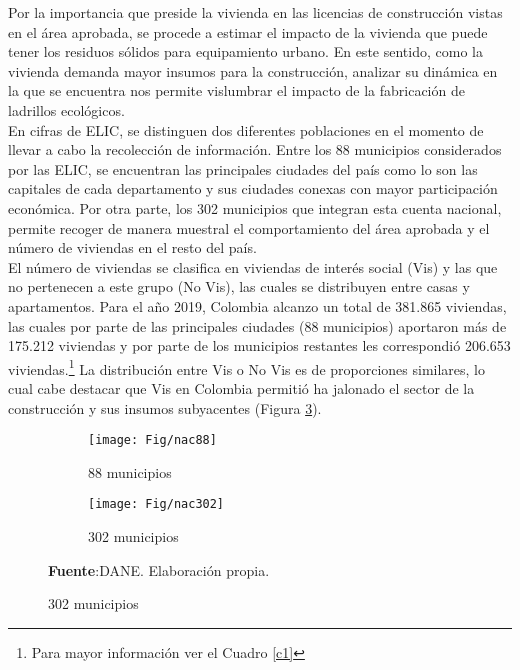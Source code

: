 \documentclass[12pt]{article}
\begin{document}
Por la importancia que  preside la vivienda en las licencias de construcción vistas en el área aprobada, se procede a estimar el impacto de la vivienda que puede tener los residuos sólidos para equipamiento urbano. En este sentido, como la vivienda demanda mayor insumos para la construcción, analizar su dinámica en la que se encuentra nos permite vislumbrar el impacto de la fabricación de ladrillos ecológicos.\\

En cifras de ELIC, se distinguen dos diferentes poblaciones en el momento de llevar a cabo la recolección de información. Entre los 88 municipios considerados por las ELIC, se encuentran las principales ciudades del país como lo son las capitales de cada departamento y sus ciudades conexas con mayor participación económica. Por otra parte, los 302 municipios que integran esta cuenta nacional, permite recoger de manera muestral el comportamiento del área aprobada y el número de viviendas en el resto del país.\\

El número de viviendas se clasifica en viviendas de interés social (Vis) y las que no pertenecen a este grupo (No Vis), las cuales se distribuyen entre casas y apartamentos. Para el año 2019, Colombia alcanzo un total de 381.865 viviendas, las cuales por parte de las principales ciudades (88 municipios) aportaron más de 175.212 viviendas y por parte de los municipios restantes les correspondió 206.653 viviendas.\footnote{Para mayor información ver el Cuadro \ref{c1} }  La distribución entre Vis o No Vis es de proporciones similares, lo cual cabe destacar que Vis en Colombia permitió ha jalonado el sector de la construcción y sus insumos subyacentes (Figura \ref{4}).
\begin{figure}[H]
\caption{Composición de la vivienda en Colombia en el 2019}
\begin{subfigure}{0.48\textwidth}
  \centering
	\texttt{[image: Fig/nac88]} 
  \caption{88 municipios}
  \label{A11}
\end{subfigure}
\begin{subfigure}{0.48\textwidth}
  \centering
	\texttt{[image: Fig/nac302]} 
  \caption{302 municipios}
  \label{A12}
\end{subfigure}
\raggedright  \scriptsize \textbf{Fuente}:DANE. Elaboración propia.
	\label{4}	
\end{figure}
\end{document}
